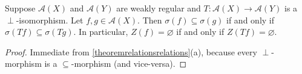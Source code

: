 
\begin{theorem}\label{theoremdisjoint}
Suppose $\mathcal{A}(X)$ and $\mathcal{A}(Y)$ are weakly regular and $T:\mathcal{A}(X)\to\mathcal{A}(Y)$ is a $\perp$-isomorphism. Let $f,g\in\mathcal{A}(X)$. Then $\sigma(f)\subseteq \sigma(g)$ if and only if $\sigma(Tf)\subseteq \sigma(Tg)$. In particular, $Z(f)=\varnothing$ if and only if $Z(Tf)=\varnothing$.
\end{theorem}
\begin{proof}
Immediate from \ref{theoremrelationsrelations}(a), because every $\perp$-morphism is a $\subseteq$-morphism (and vice-versa).\qedhere
\end{proof}

